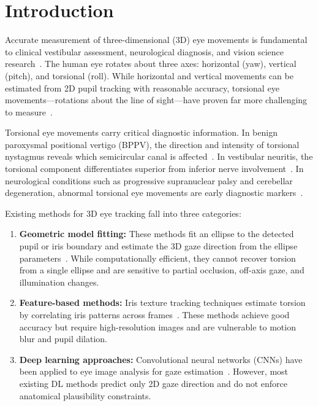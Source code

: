 \documentclass[review]{elsarticle}
\begin{document}
\section{Introduction}

Accurate measurement of three-dimensional (3D) eye movements is fundamental to clinical vestibular assessment, neurological diagnosis, and vision science research~\cite{Halmagyi2021,MacDougall2009}. The human eye rotates about three axes: horizontal (yaw), vertical (pitch), and torsional (roll). While horizontal and vertical movements can be estimated from 2D pupil tracking with reasonable accuracy, torsional eye movements---rotations about the line of sight---have proven far more challenging to measure~\cite{Hess1999,Angelaki2000}.

Torsional eye movements carry critical diagnostic information. In benign paroxysmal positional vertigo (BPPV), the direction and intensity of torsional nystagmus reveals which semicircular canal is affected~\cite{Yang2022,Wu2022}. In vestibular neuritis, the torsional component differentiates superior from inferior nerve involvement~\cite{Halmagyi2021}. In neurological conditions such as progressive supranuclear palsy and cerebellar degeneration, abnormal torsional eye movements are early diagnostic markers~\cite{Agrawal2019}.

Existing methods for 3D eye tracking fall into three categories:

\begin{enumerate}
    \item \textbf{Geometric model fitting:} These methods fit an ellipse to the detected pupil or iris boundary and estimate the 3D gaze direction from the ellipse parameters~\cite{Swirski2012}. While computationally efficient, they cannot recover torsion from a single ellipse and are sensitive to partial occlusion, off-axis gaze, and illumination changes.
    \item \textbf{Feature-based methods:} Iris texture tracking techniques estimate torsion by correlating iris patterns across frames~\cite{Houben2006,Moore2011}. These methods achieve good accuracy but require high-resolution images and are vulnerable to motion blur and pupil dilation.
    \item \textbf{Deep learning approaches:} Convolutional neural networks (CNNs) have been applied to eye image analysis for gaze estimation~\cite{Fuhl2021,Khan2019,Zhao2025}. However, most existing DL methods predict only 2D gaze direction and do not enforce anatomical plausibility constraints.
\end{enumerate}
\end{document}
